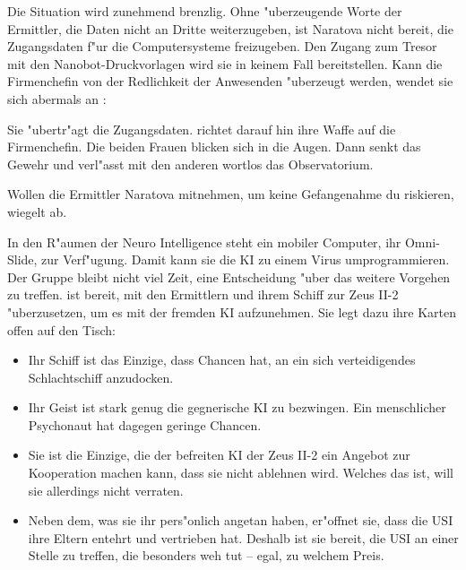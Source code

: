 
Die Situation wird zunehmend brenzlig. Ohne "uberzeugende Worte der Ermittler, die Daten nicht an Dritte weiterzugeben, ist Naratova nicht bereit, die Zugangsdaten f"ur die Computersysteme freizugeben. Den Zugang zum Tresor mit den Nanobot-Druckvorlagen wird sie in keinem Fall bereitstellen. Kann die Firmenchefin von der Redlichkeit der Anwesenden "uberzeugt werden, wendet sie sich abermals an \ml{}:


Sie "ubertr"agt \ml{} die Zugangsdaten. \xl{} richtet darauf hin ihre Waffe auf die Firmenchefin. Die beiden Frauen blicken sich in die Augen. Dann senkt \xl{} das Gewehr und verl"asst mit den anderen wortlos das Observatorium.

Wollen die Ermittler Naratova mitnehmen, um keine Gefangenahme du riskieren, wiegelt \xl{} ab. 


In den R"aumen der Neuro Intelligence steht \ml{} ein mobiler Computer, ihr Omni-Slide, zur Verf"ugung. Damit kann sie die KI zu einem Virus umprogrammieren. Der Gruppe bleibt nicht viel Zeit, eine Entscheidung "uber das weitere Vorgehen zu treffen. \xl{} ist bereit, mit den Ermittlern und ihrem Schiff zur Zeus II-2 "uberzusetzen, um es mit der fremden KI aufzunehmen. Sie legt dazu ihre Karten offen auf den Tisch:

\begin{itemize}
	\item Ihr Schiff ist das Einzige, dass Chancen hat, an ein sich verteidigendes Schlachtschiff anzudocken.
	\item Ihr Geist ist stark genug die gegnerische KI zu bezwingen. Ein menschlicher Psychonaut hat dagegen geringe Chancen.
	\item Sie ist die Einzige, die der befreiten KI der Zeus II-2 ein Angebot zur Kooperation machen kann, dass sie nicht ablehnen wird. 
		Welches das ist, will sie allerdings nicht verraten.
    \item Neben dem, was sie ihr pers"onlich angetan haben, er"offnet sie, dass die USI ihre Eltern entehrt und vertrieben hat. Deshalb ist sie bereit, die USI an einer Stelle zu treffen, die besonders weh tut -- egal, zu welchem Preis.
\end{itemize}

